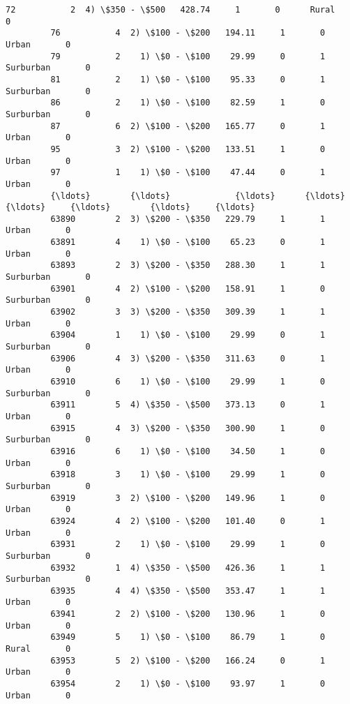 \documentclass[11pt]{article}
\begin{document}
\begin{Verbatim}[commandchars=\\\{\}]
         72           2  4) \$350 - \$500   428.74     1       0      Rural       0   
         76           4  2) \$100 - \$200   194.11     1       0      Urban       0   
         79           2    1) \$0 - \$100    29.99     0       1  Surburban       0   
         81           2    1) \$0 - \$100    95.33     0       1  Surburban       0   
         86           2    1) \$0 - \$100    82.59     1       0  Surburban       0   
         87           6  2) \$100 - \$200   165.77     0       1      Urban       0   
         95           3  2) \$100 - \$200   133.51     1       0      Urban       0   
         97           1    1) \$0 - \$100    47.44     0       1      Urban       0   
         {\ldots}        {\ldots}             {\ldots}      {\ldots}   {\ldots}     {\ldots}        {\ldots}     {\ldots}   
         63890        2  3) \$200 - \$350   229.79     1       1      Urban       0   
         63891        4    1) \$0 - \$100    65.23     0       1      Urban       0   
         63893        2  3) \$200 - \$350   288.30     1       1  Surburban       0   
         63901        4  2) \$100 - \$200   158.91     1       0  Surburban       0   
         63902        3  3) \$200 - \$350   309.39     1       1      Urban       0   
         63904        1    1) \$0 - \$100    29.99     0       1  Surburban       0   
         63906        4  3) \$200 - \$350   311.63     0       1      Urban       0   
         63910        6    1) \$0 - \$100    29.99     1       0  Surburban       0   
         63911        5  4) \$350 - \$500   373.13     0       1      Urban       0   
         63915        4  3) \$200 - \$350   300.90     1       0  Surburban       0   
         63916        6    1) \$0 - \$100    34.50     1       0      Urban       0   
         63918        3    1) \$0 - \$100    29.99     1       0  Surburban       0   
         63919        3  2) \$100 - \$200   149.96     1       0      Urban       0   
         63924        4  2) \$100 - \$200   101.40     0       1      Urban       0   
         63931        2    1) \$0 - \$100    29.99     1       0  Surburban       0   
         63932        1  4) \$350 - \$500   426.36     1       1  Surburban       0   
         63935        4  4) \$350 - \$500   353.47     1       1      Urban       0   
         63941        2  2) \$100 - \$200   130.96     1       0      Urban       0   
         63949        5    1) \$0 - \$100    86.79     1       0      Rural       0   
         63953        5  2) \$100 - \$200   166.24     0       1      Urban       0   
         63954        2    1) \$0 - \$100    93.97     1       0      Urban       0   

\end{Verbatim}
\end{document}
